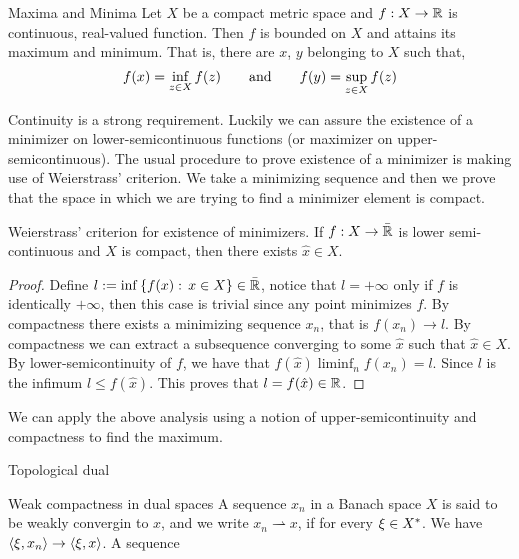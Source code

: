 \begin{theorem}{Maxima and Minima}
	Let $X$ be a compact metric space and $f: X\rightarrow \mathbb{R}$ is continuous, real-valued function. Then $f$ is bounded on $X$ and attains its maximum and minimum. That is, there are $x$, $y$ belonging to $X$ such that,
	\begin{equation*}
		f(x)=\inf_{z\in X}f(z) \qquad \mathrm{and} \qquad f(y)=\sup_{z \in X} f(z)
	\end{equation*}
\end{theorem}
Continuity is a strong requirement. Luckily we can assure the existence of a minimizer on lower-semicontinuous functions (or maximizer on upper-semicontinuous). The usual procedure to prove existence of a minimizer is making use of Weierstrass' criterion. We take a minimizing sequence and then we prove that the space in which we are trying to find a minimizer element is compact.
\begin{theorem}{Weierstrass' criterion for existence of minimizers.}
	If $f: X\rightarrow\bar{\mathbb{R}}$ is lower semi-continuous and $X$ is compact, then there exists $\hat x \in X$.
	\begin{proof}
		Define $l:=\inf\left\lbrace f(x): \, x \in X \right\rbrace \in \bar{\mathbb{R}}$, notice that $l=+\infty$ only if $f$ is identically $+\infty$, then this case is trivial since any point minimizes $f$. By compactness there exists a minimizing sequence $x_n$, that is $f(x_n)\rightarrow l$. By compactness we can extract a subsequence converging to some $\hat x$ such that $\hat x \in X$. By lower-semicontinuity of $f$, we have that $f(\hat x)\liminf_n f(x_n)=l$. Since $l$ is the infimum $l\leq f(\hat x)$. This proves that $l=f(\hat{x}) \in \mathbb{R}$.
	\end{proof}
\end{theorem}

We can apply the above analysis using a notion of upper-semicontinuity and compactness to find the maximum. 
\begin{definition}{Topological dual}
	
\end{definition}

\begin{definition}{Weak compactness in dual spaces}
	A sequence $x_n$ in a Banach space $X$ is said to be weakly convergin to $x$, and we write $x_n \rightharpoonup x$, if for every $\xi \in {X}^*$. We have $\left\langle \xi, x_n \right\rangle\rightarrow \left\langle \xi, x \right\rangle$. A sequence
\end{definition}

